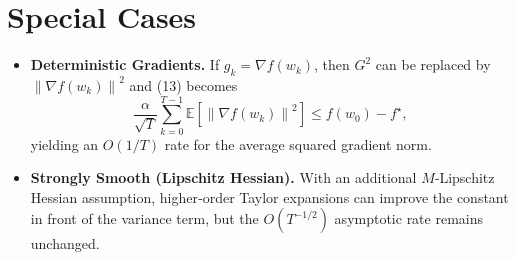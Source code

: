 \documentclass[11pt]{article}
\newcommand{\EE}{\mathbb{E}}
\newcommand{\norm}[1]{\left\|#1\right\|}
\begin{document}
\section*{Special Cases}
\begin{itemize}
\item \textbf{Deterministic Gradients.} If $g_k=\nabla f(w_k)$, then $G^2$ can be replaced by $\norm{\nabla f(w_k)}^2$ and (13) becomes
\[
\frac{\alpha}{\sqrt{T}}\sum_{k=0}^{T-1}\EE\!\left[\norm{\nabla f(w_k)}^2\right]
\le f(w_0)-f^\star ,
\]
yielding an $O(1/T)$ rate for the average squared gradient norm.
\item \textbf{Strongly Smooth (Lipschitz Hessian).} With an additional $M$‑Lipschitz Hessian assumption, higher‑order Taylor expansions can improve the constant in front of the variance term, but the $O(T^{-1/2})$ asymptotic rate remains unchanged.
\end{itemize}
\end{document}
